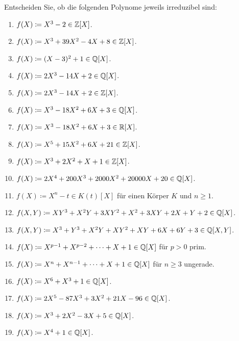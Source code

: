 \begin{question}[subtitle = Irreduziblität von Polynomen]
  \label{question: irreducibility of polynomials}
  Entscheiden Sie, ob die folgenden Polynome jeweils irreduzibel sind:
  \begin{enumerate}
    \item
      $f(X) \coloneqq X^3 - 2 \in \mathbb{Z}[X]$.
    \item
      $f(X) \coloneqq X^3 + 39 X^2 - 4X + 8 \in \mathbb{Z}[X]$.
    \item
      $f(X) \coloneqq (X - 3)^2 + 1 \in \mathbb{Q}[X]$.
    \item
      $f(X) \coloneqq 2X^3 - 14X + 2 \in \mathbb{Q}[X]$.
    \item
      $f(X) \coloneqq 2X^3 - 14X + 2 \in \mathbb{Z}[X]$.
    \item
      $f(X) \coloneqq X^3 - 18 X^2 + 6 X + 3 \in \mathbb{Q}[X]$.
    \item
      $f(X) \coloneqq X^3 - 18 X^2 + 6 X + 3 \in \mathbb{R}[X]$.
    \item
      $f(X) \coloneqq X^5 + 15 X^2 + 6 X + 21 \in \mathbb{Z}[X]$.
    \item
      $f(X) \coloneqq X^3 + 2 X^2 + X + 1 \in \mathbb{Z}[X]$.
    \item
      $f(X) \coloneqq 2X^4 + 200 X^3 + 2000 X^2 + 20000 X + 20 \in \mathbb{Q}[X]$.
    \item
      $f(X) \coloneqq  X^n - t \in K(t)[X]$ für einen Körper $K$ und $n \geq 1$.
    \item
      $f(X,Y) \coloneqq X Y^3 + X^2 Y + 3 X Y^2 + X^2 + 3 X Y + 2 X + Y + 2 \in \mathbb{Q}[X]$.
    \item
      $f(X,Y) \coloneqq X^3 + Y^3 + X^2 Y + X Y^2 + XY + 6 X + 6 Y + 3 \in \mathbb{Q}[X,Y]$.
    \item
      $f(X) \coloneqq X^{p-1} + X^{p-2} + \dotsb + X + 1 \in \mathbb{Q}[X]$ für $p > 0$ prim.
    \item
      $f(X) \coloneqq X^n + X^{n-1} + \dotsb + X + 1 \in \mathbb{Q}[X]$ für $n \geq 3$ ungerade.
    \item
      $f(X) \coloneqq X^6 + X^3 + 1 \in \mathbb{Q}[X]$.
    \item
      $f(X) \coloneqq 2 X^5  - 87 X^3 + 3 X^2 + 21 X - 96 \in \mathbb{Q}[X]$.
    \item
      $f(X) \coloneqq X^3 + 2 X^2 - 3 X + 5 \in \mathbb{Q}[X]$.
    \item
      $f(X) \coloneqq X^4 + 1 \in \mathbb{Q}[X]$.
  \end{enumerate}
\end{question}


